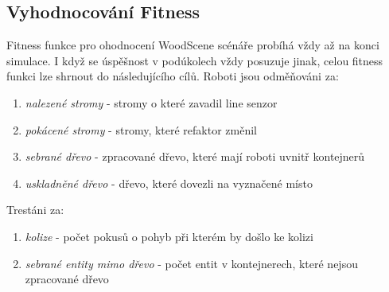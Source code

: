 \subsection{Vyhodnocování Fitness}
Fitness funkce pro ohodnocení WoodScene scénáře probíhá vždy až na konci simulace. I když se úspěšnost v podúkolech  vždy posuzuje jinak, celou fitness funkci lze shrnout do následujícího cílů. Roboti jsou odměňováni za: 
\begin{enumerate}
        \item \textit{nalezené stromy} - stromy o které zavadil line senzor 
        \item \textit{pokácené stromy} - stromy, které refaktor změnil 
        \item \textit{sebrané dřevo} - zpracované dřevo, které mají roboti uvnitř kontejnerů 
        \item \textit{uskladněné dřevo} - dřevo, které dovezli na vyznačené místo 
\end{enumerate}
Trestáni za:
\begin{enumerate}
	\item \textit{kolize} - počet pokusů o pohyb při kterém by došlo ke kolizi 
	\item \textit{sebrané entity mimo dřevo} - počet entit v kontejnerech, které nejsou zpracované dřevo 
\end{enumerate}

